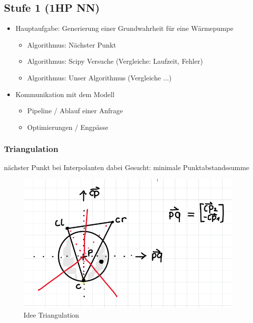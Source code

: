 \documentclass[a4paper]{extarticle}
\begin{document}
    \subsection{Stufe 1 (1HP NN)}
    \begin{itemize}
        \item Hauptaufgabe: Generierung einer Grundwahrheit für eine Wärmepumpe
        \begin{itemize}
            \item Algorithmus: Nächster Punkt
            \item Algorithmus: Scipy Versuche (Vergleiche: Laufzeit, Fehler)
            \item Algorithmus: Unser Algorithmus (Vergleiche ...)
        \end{itemize}
        \item Kommunikation mit dem Modell
        \begin{itemize}
            \item Pipeline / Ablauf einer Anfrage
            \item Optimierungen / Engpässe
        \end{itemize}
    \end{itemize}
    \subsubsection{Triangulation}
    nächster Punkt bei Interpolanten dabei
        Gesucht: minimale Punktabstandssumme

    \begin{figure}[!ht]
        \centering	
        \includegraphics[scale=0.5]{triangulation_1_img.png}
        \caption{Idee Triangulation}
        \label{fig:triangulation_1}
    \end{figure}
\end{document}

